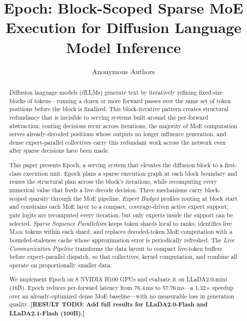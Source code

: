 \documentclass[sigconf,review,anonymous, 10pt]{acmart}
\title{Epoch: Block-Scoped Sparse MoE Execution for Diffusion Language Model Inference}
\author{Anonymous Authors}
\affiliation{\institution{Paper under submission}}
\newcommand{\resulttodo}[1]{\textcolor{todored}{\textbf{[RESULT TODO: #1]}}}
\newcommand{\sys}{Epoch}
\newcommand{\mask}{\textsc{Mask}}
\begin{document}
\begin{abstract}
Diffusion language models (dLLMs) generate text by iteratively refining fixed-size blocks of tokens---running a dozen or more forward passes over the same set of token positions before the block is finalized.
This block-iterative pattern creates structural redundancy that is invisible to serving systems built around the per-forward abstraction: routing decisions recur across iterations, the majority of MoE computation serves already-decoded positions whose outputs no longer influence generation, and dense expert-parallel collectives carry this redundant work across the network even after sparse decisions have been made.

This paper presents \sys{}, a serving system that elevates the diffusion block to a first-class execution unit.
\sys{} plans a sparse execution graph at each block boundary and reuses the structural plan across the block's iterations, while recomputing every numerical value that feeds a live decode decision.
Three mechanisms carry block-scoped sparsity through the MoE pipeline.
\emph{Expert Budget} profiles routing at block start and constrains each MoE layer to a compact, coverage-driven active expert support; gate logits are recomputed every iteration, but only experts inside the support can be selected.
\emph{Sparse Sequence Parallelism} keeps token shards local to ranks, identifies live \mask{} tokens within each shard, and replaces decoded-token MoE computation with a bounded-staleness cache whose approximation error is periodically refreshed.
The \emph{Live Communication Pipeline} transforms the data layout to compact live-token buffers before expert-parallel dispatch, so that collectives, kernel computation, and combine all operate on proportionally smaller data.

We implement \sys{} on 8 NVIDIA H100 GPUs and evaluate it on LLaDA2.0-mini (16B).
\sys{} reduces per-forward latency from 76.4\,ms to 57.76\,ms---a 1.32$\times$ speedup over an already-optimized dense MoE baseline---with no measurable loss in generation quality.
\resulttodo{Add full results for LLaDA2.0-Flash and LLaDA2.1-Flash (100B).}
\end{abstract}

\maketitle

\end{document}

